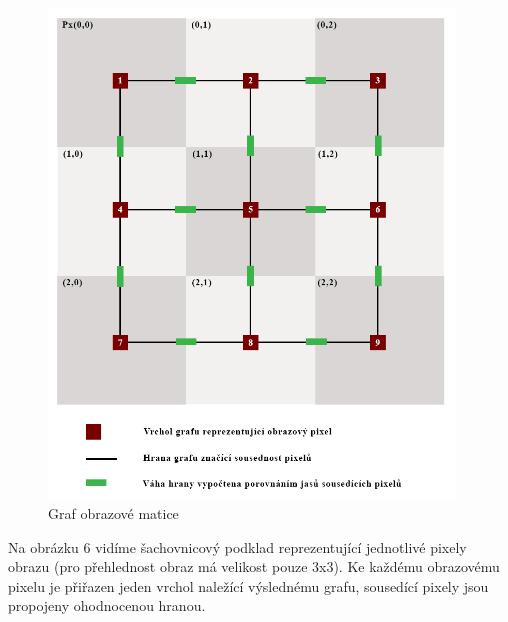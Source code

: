 \documentclass[czech, master, public, dept460, male, cpdeclaration, oneside]{diploma}
\begin{document}
\begin{figure}[H]
	\vspace*{+3.0mm}
	\centering
	\includegraphics[height=13cm]{Figures/explanatory/imageAsGraph.png}
	\caption{Graf obrazové matice}
\end{figure}
\noindent
Na obrázku 6 vidíme šachovnicový podklad reprezentující jednotlivé pixely obrazu (pro přehlednost obraz má velikost pouze 3x3). Ke každému obrazovému pixelu je přiřazen jeden vrchol naležící výslednému grafu, sousedící pixely jsou propojeny ohodnocenou hranou. 
\newpage
\end{document}
